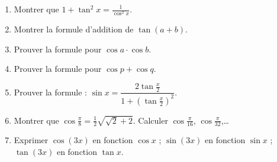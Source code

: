 \begin{frame}
\begin{miniexercice}
\begin{enumerate}
  \item Montrer que $1+\tan^2x=\frac{1}{\cos^2x}$.
  \item Montrer la formule d'addition de $\tan(a+b)$.
  \item Prouver la formule pour $\cos a\cdot\cos b$.
  \item Prouver la formule pour $\cos p+\cos q$.
  \item Prouver la formule : $\sin x = \dfrac{2\tan \frac{x}{2}}{1+(\tan \frac{x}{2})^2}$.
  \item Montrer que $\cos \frac{\pi}{8}= \frac 12\sqrt{ \sqrt{2} + 2}$. Calculer $\cos \frac{\pi}{16}$,
$\cos \frac{\pi}{32}$,\ldots
  \item Exprimer $\cos(3x)$ en fonction $\cos x$ ; $\sin(3x)$ en fonction $\sin x$ ;
$\tan(3x)$ en fonction $\tan x$.
\end{enumerate}
\end{miniexercice}
\end{frame}




